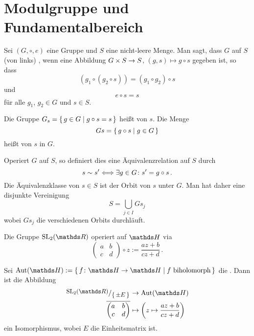 \section{Modulgruppe und Fundamentalbereich}

\begin{defi}
Sei $(G, \circ, e)$ eine Gruppe und $S$ eine nicht-leere Menge. Man sagt, dass $G$ auf $S$ (von links) , wenn eine Abbildung $G \times S \rightarrow S$, $(g, s) \mapsto g \circ s$ gegeben ist, so dass
\[
	(g_1 \circ (g_2 \circ s)) = (g_1 \circ g_2) \circ s
\]
und
\[
	e \circ s = s
\]
für alle $g_1$, $g_2 \in G$ und $s \in S$.

Die Gruppe $G_s = \left\{\,g \in G \mid g \circ s = s\,\right\}$ heißt  von $s$.
Die Menge
\[
	Gs = \left\{\,g \circ s \mid g\in G\,\right\}
\]
heißt  von $s$ in $G$.
\end{defi}

Operiert $G$ auf $S$, so definiert dies eine Äquivalenzrelation auf $S$ durch
\[
	s \sim s'
	\Longleftrightarrow \exists g \in G\colon s' = g \circ s
	\,.
\]
Die Äquivalenzklasse von $s \in S$ ist der Orbit von $s$ unter $G$.
Man hat daher eine disjunkte Vereinigung
\[
	S = \bigcup_{j\in I} Gs_j
\]
wobei $Gs_j$ die verschiedenen Orbits durchläuft.

\begin{satz-list}
\item Die Gruppe $\SL_2(\RR)$ operiert auf $\HH$ via
\[
		\begin{pmatrix}
			a & b \\
			c & d
		\end{pmatrix}
		\circ z
	:= \frac{az+b}{cz+d}
	\,.
\]

\item Sei $\Aut(\HH) := \Set{f\colon\HH \ra \HH \mid f \text{ biholomorph}}$ die .
Dann ist die Abbildung
\begin{align*}
	\modulo{\SL_2(\RR)}{\Set{\pm E}} &\ra \Aut(\HH)\\
		\overline{\begin{pmatrix}
			a & b \\
			c & d
		\end{pmatrix}}
		&\mapsto
		\left( z \mapsto \frac{az+b}{cz+d} \right)
\end{align*}
ein Isomorphismus, wobei $E$ die Einheitsmatrix ist.
\end{satz-list}

